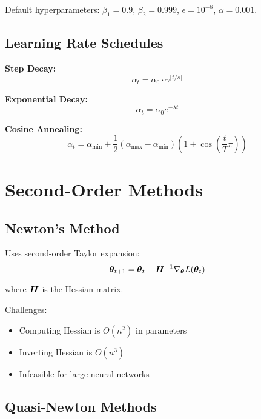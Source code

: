 Default hyperparameters: $\beta_1 = 0.9$, $\beta_2 = 0.999$, $\epsilon = 10^{-8}$, $\alpha = 0.001$.

\subsection{Learning Rate Schedules}

\textbf{Step Decay:}
\begin{equation}
\alpha_t = \alpha_0 \cdot \gamma^{\lfloor t / s \rfloor}
\end{equation}

\textbf{Exponential Decay:}
\begin{equation}
\alpha_t = \alpha_0 e^{-\lambda t}
\end{equation}

\textbf{Cosine Annealing:}
\begin{equation}
\alpha_t = \alpha_{\min} + \frac{1}{2}(\alpha_{\max} - \alpha_{\min})\left(1 + \cos\left(\frac{t}{T}\pi\right)\right)
\end{equation}

\section{Second-Order Methods}
\label{sec:second-order}

\subsection{Newton's Method}

Uses second-order Taylor expansion:
\begin{equation}
\boldsymbol{\theta}_{t+1} = \boldsymbol{\theta}_t - \boldsymbol{H}^{-1} \nabla_{\boldsymbol{\theta}} L(\boldsymbol{\theta}_t)
\end{equation}

where $\boldsymbol{H}$ is the Hessian matrix.

Challenges:
\begin{itemize}
    \item Computing Hessian is $O(n^2)$ in parameters
    \item Inverting Hessian is $O(n^3)$
    \item Infeasible for large neural networks
\end{itemize}

\subsection{Quasi-Newton Methods}

